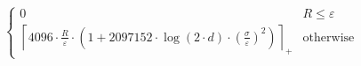 \[\begin{cases} 0 & R \leq \varepsilon \\ \left\lceil 4096 \cdot \frac{R}{\varepsilon} \cdot \left(1 + 2097152 \cdot \log\left(2 \cdot d\right) \cdot \left(\frac{\sigma}{\varepsilon}\right)^{2}\right) \right\rceil_{+} & \mathrm{otherwise} \end{cases}\]
